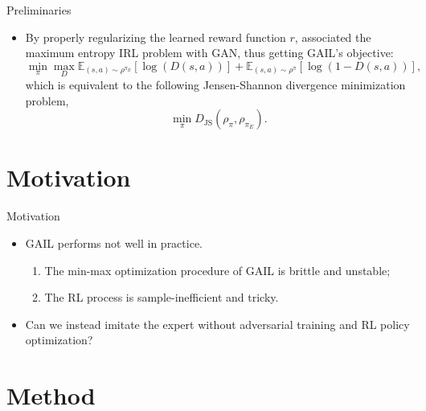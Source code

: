 \documentclass[10pt,aspectratio=169]{beamer}
\begin{document}
\begin{frame}{Preliminaries}
\begin{itemize}
		\item By properly regularizing the learned reward function $r$, \citep{gail} associated the maximum entropy IRL problem with GAN, thus getting GAIL's objective:
		      \[
			      \min_\pi \max_D \mathbb{E}_{(s,a)\sim \rho^{\pi_E}}\left[\log\left(D(s,a)\right)\right] + \mathbb{E}_{(s,a)\sim \rho^{\pi}}\left[\log\left(1-D(s,a)\right)\right],
		      \]
		      which is equivalent to the following Jensen-Shannon divergence minimization problem,
		      \[
			      \min_\pi D_\text{JS}(\rho_\pi, \rho_{\pi_E}).
		      \]
	\end{itemize}
\end{frame}

\section{Motivation}

\begin{frame}{Motivation}
	\begin{itemize}
		\item GAIL performs not well in practice.
		      \begin{enumerate}
			      \item The min-max optimization procedure of GAIL is brittle and unstable;
			      \item The RL process is sample-inefficient and tricky.
		      \end{enumerate}
		\item {\color{red} Can we instead imitate the expert without adversarial training and RL policy optimization?}
	\end{itemize}
\end{frame}

\section{Method}
\end{document}
